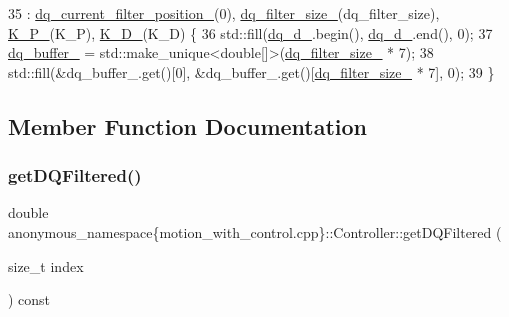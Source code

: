 \begin{DoxyCode}
35       : \hyperlink{classanonymous__namespace_02motion__with__control_8cpp_03_1_1Controller_a81ac6a197c91f10e2705c015c0ac3144}{dq\_current\_filter\_position\_}(0), 
      \hyperlink{classanonymous__namespace_02motion__with__control_8cpp_03_1_1Controller_aa8028a675125bc719556cb50e7736a8f}{dq\_filter\_size\_}(dq\_filter\_size), \hyperlink{classanonymous__namespace_02motion__with__control_8cpp_03_1_1Controller_a5d89d12c8a2909c46bb45adf35073db2}{K\_P\_}(K\_P), \hyperlink{classanonymous__namespace_02motion__with__control_8cpp_03_1_1Controller_a51a2e8093f63934c9d64aa0bb7b46b38}{K\_D\_}(K\_D) \{
36     std::fill(\hyperlink{classanonymous__namespace_02motion__with__control_8cpp_03_1_1Controller_aa5f5437e65c514358d2a22e74bf0075d}{dq\_d\_}.begin(), \hyperlink{classanonymous__namespace_02motion__with__control_8cpp_03_1_1Controller_aa5f5437e65c514358d2a22e74bf0075d}{dq\_d\_}.end(), 0);
37     \hyperlink{classanonymous__namespace_02motion__with__control_8cpp_03_1_1Controller_a9c8092a809e69272e26dc32e7717b128}{dq\_buffer\_} = std::make\_unique<double[]>(\hyperlink{classanonymous__namespace_02motion__with__control_8cpp_03_1_1Controller_aa8028a675125bc719556cb50e7736a8f}{dq\_filter\_size\_} * 7);
38     std::fill(&dq\_buffer\_.get()[0], &dq\_buffer\_.get()[\hyperlink{classanonymous__namespace_02motion__with__control_8cpp_03_1_1Controller_aa8028a675125bc719556cb50e7736a8f}{dq\_filter\_size\_} * 7], 0);
39   \}
\end{DoxyCode}


\subsection{Member Function Documentation}
\mbox{\label{classanonymous__namespace_02motion__with__control_8cpp_03_1_1Controller_a0d18eda568c814126311d95e851094fb}} 
\subsubsection{\texorpdfstring{get\+D\+Q\+Filtered()}{getDQFiltered()}}
{\footnotesize\ttfamily double anonymous\+\_\+namespace\{motion\+\_\+with\+\_\+control.\+cpp\}\+::Controller\+::get\+D\+Q\+Filtered (\begin{DoxyParamCaption}\item[{size\+\_\+t}]{index }\end{DoxyParamCaption}) const\hspace{0.3cm}{\ttfamily [inline]}}



